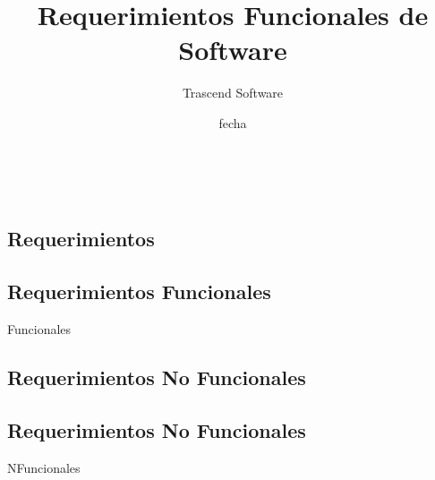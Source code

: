 \documentclass{article}
\title{Requerimientos Funcionales de Software}
\date
{
fecha
}
\author{
Trascend Software
}
\begin{document}


\maketitle %
\newpage %
\
\begin{center}
	\section{Requerimientos}
\end{center}

\subsection{Requerimientos Funcionales}
Funcionales

\begin{center}
	\section{Requerimientos No Funcionales}
\end{center}

\subsection{Requerimientos No Funcionales}
NFuncionales
\end{document}
